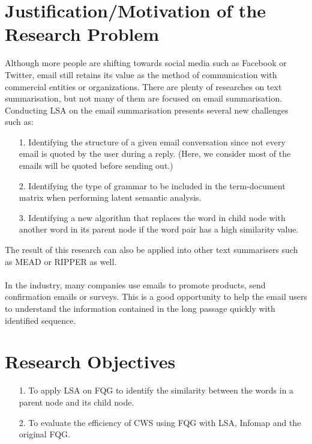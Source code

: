 \documentclass[a4paper, 12pt]{article}
\begin{document}
\section*{Justification/Motivation of the Research Problem}
Although more people are shifting towards social media such as Facebook or Twitter, email still retains its value as the method of communication with commercial entities or organizations. There are plenty of researches on text summarisation, but not many of them are focused on email summarisation. Conducting LSA on the email summarisation presents several new challenges such as:

\begin{itemize}
	\item[1.] Identifying the structure of a given email conversation since not every email is quoted by the user during a reply. (Here, we consider most of the emails will be quoted before sending out.)

	\item[2.] Identifying the type of grammar to be included in the term-document matrix when performing latent semantic analysis.

	\item[3.] Identifying a new algorithm that replaces the word in child node with another word in its parent node if the word pair has a high similarity value.
\end{itemize}

\noindent
The result of this research can also be applied into other text summarisers such as MEAD or RIPPER as well.
\\ \\
In the industry, many companies use emails to promote products, send confirmation emails or surveys. This is a good opportunity to help the email users to understand the information contained in the long passage quickly with identified sequence.

\section*{Research Objectives}
\begin{itemize}
	\item[1.] To apply LSA on FQG to identify the similarity between the words in a parent node and its child node.

	\item[2.] To evaluate the efficiency of CWS using FQG with LSA, Infomap and the original FQG.
\end{itemize}
\end{document}
